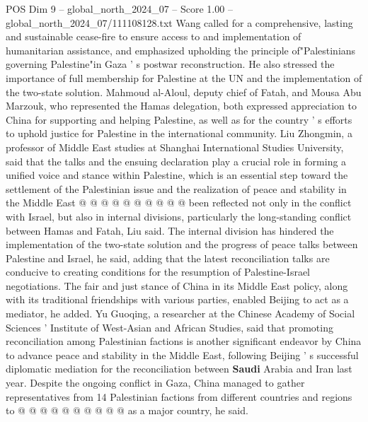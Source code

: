 \begin{textsample}{POS Dim 9 – global\_north\_2024\_07 – Score 1.00 – global\_north\_2024\_07/111108128.txt}
Wang called for a comprehensive, lasting and sustainable cease-fire to ensure access to and implementation of humanitarian assistance, and emphasized upholding the principle of"Palestinians governing Palestine"in Gaza ' s postwar reconstruction.
He also stressed the importance of full membership for Palestine at the UN and the implementation of the two-state solution.
Mahmoud al-Aloul, deputy chief of Fatah, and Mousa Abu Marzouk, who represented the Hamas delegation, both expressed appreciation to China for supporting and helping Palestine, as well as for the country ' s efforts to uphold justice for Palestine in the international community.
Liu Zhongmin, a professor of Middle East studies at Shanghai International Studies University, said that the talks and the ensuing declaration play a crucial role in forming a unified voice and stance within Palestine, which is an essential step toward the settlement of the Palestinian issue and the realization of peace and stability in the Middle East @ @ @ @ @ @ @ @ @ @ been reflected not only in the conflict with Israel, but also in internal divisions, particularly the long-standing conflict between Hamas and Fatah, Liu said.
The internal division has hindered the implementation of the two-state solution and the progress of peace talks between Palestine and Israel, he said, adding that the latest reconciliation talks are conducive to creating conditions for the resumption of Palestine-Israel negotiations.
The fair and just stance of China in its Middle East policy, along with its traditional friendships with various parties, enabled Beijing to act as a mediator, he added.
Yu Guoqing, a researcher at the Chinese Academy of Social Sciences ' Institute of West-Asian and African Studies, said that promoting reconciliation among Palestinian factions is another significant endeavor by China to advance peace and stability in the Middle East, following Beijing ' s successful diplomatic mediation for the reconciliation between \textbf{Saudi} Arabia and Iran last year.
Despite the ongoing conflict in Gaza, China managed to gather representatives from 14 Palestinian factions from different countries and regions to @ @ @ @ @ @ @ @ @ @ as a major country, he said.

\end{textsample}

